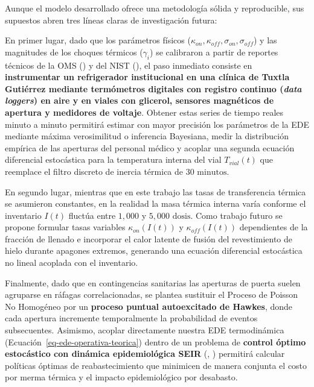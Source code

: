 \documentclass[
  spanish,
  us-letterpaper,
]{scrreprt}
\numberwithin{equation}{section}
\theoremstyle{plain}
\theoremstyle{plain}
\theoremstyle{plain}
\theoremstyle{definition}
\theoremstyle{remark}
\begin{document}
Aunque el modelo desarrollado ofrece una metodología sólida y
reproducible, sus supuestos abren tres líneas claras de investigación
futura:

En primer lugar, dado que los parámetros físicos
(\(\kappa_{on}, \kappa_{off}, \sigma_{on}, \sigma_{off}\)) y las
magnitudes de los choques térmicos (\(\gamma_i\)) se calibraron a partir
de reportes técnicos de la OMS () y del NIST
(), el paso
inmediato consiste en \textbf{instrumentar un refrigerador institucional
en una clínica de Tuxtla Gutiérrez mediante termómetros digitales con
registro continuo (\emph{data loggers}) en aire y en viales con
glicerol, sensores magnéticos de apertura y medidores de voltaje}.
Obtener estas series de tiempo reales minuto a minuto permitirá estimar
con mayor precisión los parámetros de la EDE mediante máxima
verosimilitud o inferencia Bayesiana, medir la distribución empírica de
las aperturas del personal médico y acoplar una segunda ecuación
diferencial estocástica para la temperatura interna del vial
\(T_{vial}(t)\) que reemplace el filtro discreto de inercia térmica de
\(30\text{ minutos}\).

En segundo lugar, mientras que en este trabajo las tasas de
transferencia térmica se asumieron constantes, en la realidad la masa
térmica interna varía conforme el inventario \(I(t)\) fluctúa entre
\(1,000\) y \(5,000\text{ dosis}\). Como trabajo futuro se propone
formular tasas variables \(\kappa_{on}(I(t))\) y \(\kappa_{off}(I(t))\)
dependientes de la fracción de llenado e incorporar el calor latente de
fusión del revestimiento de hielo durante apagones extremos, generando
una ecuación diferencial estocástica no lineal acoplada con el
inventario.

Finalmente, dado que en contingencias sanitarias las aperturas de puerta
suelen agruparse en ráfagas correlacionadas, se plantea sustituir el
Proceso de Poisson No Homogéneo por un \textbf{proceso puntual
autoexcitado de Hawkes}, donde cada apertura incremente temporalmente la
probabilidad de eventos subsecuentes. Asimismo, acoplar directamente
nuestra EDE termodinámica (Ecuación~\ref{eq-ede-operativa-teorica})
dentro de un problema de \textbf{control óptimo estocástico con dinámica
epidemiológica SEIR} (,
) permitirá calcular políticas
óptimas de reabastecimiento que minimicen de manera conjunta el costo
por merma térmica y el impacto epidemiológico por desabasto.
\end{document}

